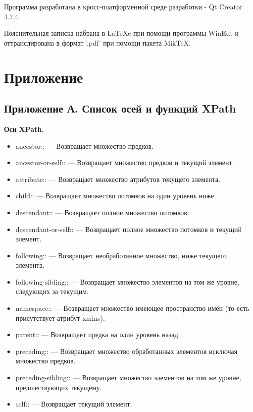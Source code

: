 \documentclass[12pt,a4paper,oneside]{article} %
\begin{document}
Программа разработана в кросс-платформенной среде разработки - \linebreak
Qt Creator 4.7.4.

Пояснительная записка набрана в LaTeXe при помощи программы WinEdt \linebreak
и оттранслирована в формат '.pdf' при помощи пакета MikTeX.
\newpage
\section{Приложение}
\subsection{Приложение А. Список осей и функций XPath}

\textbf{Оси XPath.}
\begin{itemize}
\item ancestor:: — Возвращает множество предков.
\item ancestor-or-self:: — Возвращает множество предков и текущий элемент.
\item attribute:: — Возвращает множество атрибутов текущего элемента.
\item child:: — Возвращает множество потомков на один уровень ниже.
\item descendant:: — Возвращает полное множество потомков.
\item descendant-or-self:: — Возвращает полное множество потомков и текущий  \linebreak
    элемент.
\item following:: — Возвращает необработанное множество, ниже текущего  \linebreak
элемента.
\item following-sibling:: — Возвращает множество элементов на том же  \linebreak
уровне, следующих за текущим.
\item namespace:: — Возвращает множество имеющее пространство имён  \linebreak
(то есть присутствует атрибут xmlns).
\item parent:: — Возвращает предка на один уровень назад.
\item preceding:: — Возвращает множество обработанных элементов исключая  \linebreak
множество предков.
\item preceding-sibling:: — Возвращает множество элементов на том же уровне,  \linebreak
    предшествующих текущему.
\item self:: — Возвращает текущий элемент.
\end{itemize}
\end{document}
